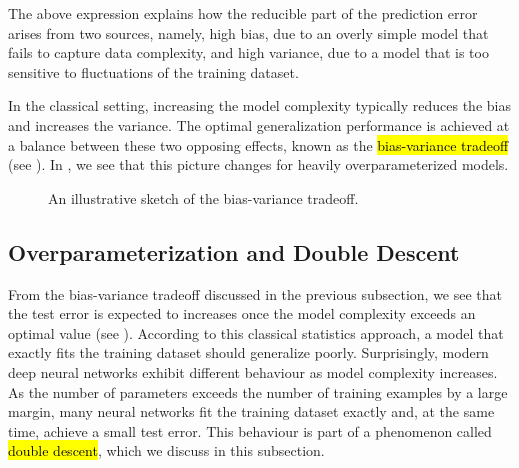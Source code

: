 The above expression explains how the reducible part of the prediction error arises from two sources, namely,
high bias, due to an overly simple model that fails to capture data complexity, and high variance, due to a model that is too sensitive to fluctuations of the training dataset.

In the classical setting, increasing the model complexity typically reduces the bias and increases the variance. The optimal generalization performance is achieved at a balance between these two opposing effects, known as the \hl{bias-variance tradeoff} (see ). In , we see that this picture changes for heavily overparameterized models.
\begin{figure}[t]
\centering

\caption{An illustrative sketch of the bias-variance tradeoff.}
\label{bias.variance.tradeoff.fig}
\end{figure}
\subsection{Overparameterization and Double Descent}
\label{double.descent.subs}
From the bias-variance tradeoff discussed in the previous subsection, we see that the test error is expected to increases once the model complexity exceeds an optimal value (see ). According to this classical statistics approach, a model that exactly fits the training dataset should generalize poorly. Surprisingly, modern deep neural networks exhibit different behaviour as model complexity increases. As the number of parameters exceeds the number of training examples by a large margin, many neural networks fit the training dataset exactly and, at the same time, achieve a small test error. This behaviour is part of a phenomenon called \hl{double descent}, which we discuss in this subsection.

